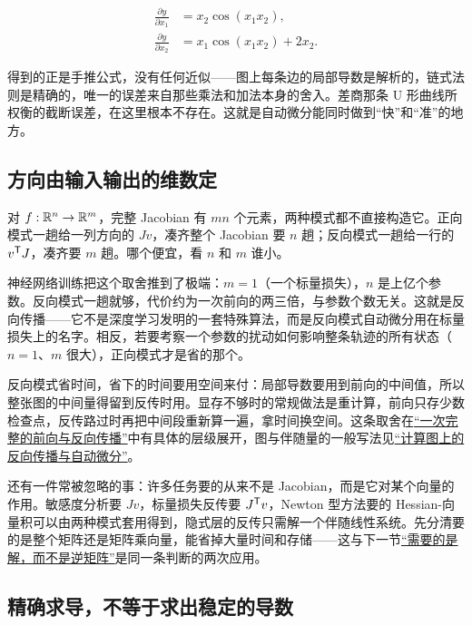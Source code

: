 \[
\begin{aligned}
\frac{\partial y}{\partial x_1}&=x_2\cos(x_1x_2),\\
\frac{\partial y}{\partial x_2}&=x_1\cos(x_1x_2)+2x_2.
\end{aligned}
\]

得到的正是手推公式，没有任何近似——图上每条边的局部导数是解析的，链式法则是精确的，唯一的误差来自那些乘法和加法本身的舍入。差商那条 U 形曲线所权衡的截断误差，在这里根本不存在。这就是自动微分能同时做到``快''和``准''的地方。

\subsection{方向由输入输出的维数定}

对 \(f:\mathbb{R}^n\to\mathbb{R}^m\)，完整 Jacobian 有 \(mn\) 个元素，两种模式都不直接构造它。正向模式一趟给一列方向的 \(Jv\)，凑齐整个 Jacobian 要 \(n\) 趟；反向模式一趟给一行的 \(v^{\mathsf{T}}J\)，凑齐要 \(m\) 趟。哪个便宜，看 \(n\) 和 \(m\) 谁小。

神经网络训练把这个取舍推到了极端：\(m=1\)（一个标量损失），\(n\) 是上亿个参数。反向模式一趟就够，代价约为一次前向的两三倍，与参数个数无关。这就是反向传播——它不是深度学习发明的一套特殊算法，而是反向模式自动微分用在标量损失上的名字。相反，若要考察一个参数的扰动如何影响整条轨迹的所有状态（\(n=1\)、\(m\) 很大），正向模式才是省的那个。

反向模式省时间，省下的时间要用空间来付：局部导数要用到前向的中间值，所以整张图的中间量得留到反传时用。显存不够时的常规做法是重计算，前向只存少数检查点，反传路过时再把中间段重新算一遍，拿时间换空间。这条取舍在\hyperref[sec:14-Deep-Learning/02-Losses-and-Backpropagation/02]{``一次完整的前向与反向传播''}中有具体的层级展开，图与伴随量的一般写法见\hyperref[sec:10-Matrix-Calculus/04-Applications/03]{``计算图上的反向传播与自动微分''}。

还有一件常被忽略的事：许多任务要的从来不是 Jacobian，而是它对某个向量的作用。敏感度分析要 \(Jv\)，标量损失反传要 \(J^{\mathsf{T}}v\)，Newton 型方法要的 Hessian-向量积可以由两种模式套用得到，隐式层的反传只需解一个伴随线性系统。先分清要的是整个矩阵还是矩阵乘向量，能省掉大量时间和存储——这与下一节\hyperref[sec:08-Numerical-Analysis/07-Numerical-Methods-for-ML/03]{``需要的是解，而不是逆矩阵''}是同一条判断的两次应用。

\subsection{精确求导，不等于求出稳定的导数}

